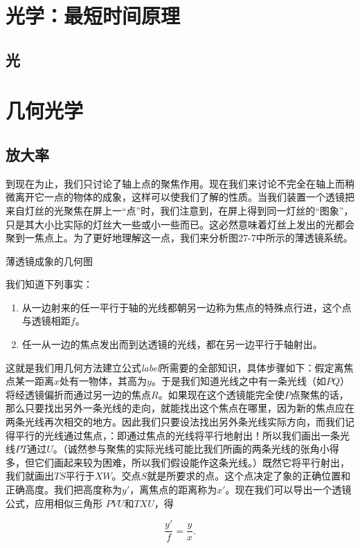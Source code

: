 \documentclass[11pt,oneside]{book}
\begin{document}
\begin{common-format}
\mainmatter

\chapter{光学：最短时间原理}

\section{光}


\chapter{几何光学}


\section{放大率}
到现在为止，我们只讨论了轴上点的聚焦作用。现在我们来讨论不完全在轴上而稍微离开它一点的物体的成象，这样可以使我们了解的性质。当我们装置一个透镜把来自灯丝的光聚焦在屏上一“点”时，我们注意到，在屏上得到同一灯丝的“图象”，只是其大小比实际的灯丝大一些或小一些而已。这必然意味着灯丝上发出的光都会聚到一焦点上。为了更好地理解这一点，我们来分析图27-7中所示的薄透镜系统。

\begin{fig}{薄透镜成象的几何图}
\label{fig:薄透镜成象的几何图}
\end{fig}

我们知道下列事实：
\begin{enumerate}
\renewcommand{\labelenumi}{(\arabic{enumi})}
\item 从一边射来的任一平行于轴的光线都朝另一边称为焦点的特殊点行进，这个点与透镜相距$ f $。
\item 任一从一边的焦点发出而到达透镜的光线，都在另一边平行于轴射出。
\end{enumerate}

这就是我们用几何方法建立公式\emph{label}所需要的全部知识，具体步骤如下：假定离焦点某一距离$ x $处有一物体，其高为$ y $。于是我们知道光线之中有一条光线（如$ PQ $）将经透镜偏折而通过另一边的焦点$ R $。如果现在这个透镜能完全使$ P $点聚焦的话，那么只要找出另外一条光线的走向，就能找出这个焦点在哪里，因为新的焦点应在两条光线再次相交的地方。因此我们只要设法找出另外条光线实际方向，而我们记得平行的光线通过焦点，：即通过焦点的光线将平行地射出！所以我们画出一条光线$ PT $通过$ U $。（诚然参与聚焦的实际光线可能比我们所画的两条光线的张角小得多，但它们画起来较为困难，所以我们假设能作这条光线。）既然它将平行射出，我们就画出$ TS $平行于$ XW $。交点$ S $就是所要求的点。这个点决定了象的正确位置和正确高度。我们把高度称为$ y' $，离焦点的距离称为$ x' $。现在我们可以导出一个透镜公式，应用相似三角形 $  PVU $和$  TXU $，得

\begin{equation}
\label{Eq:I:27:13}
\frac{y'}{f}=\frac{y}{x}.
\end{equation}











\end{common-format}
\end{document}
